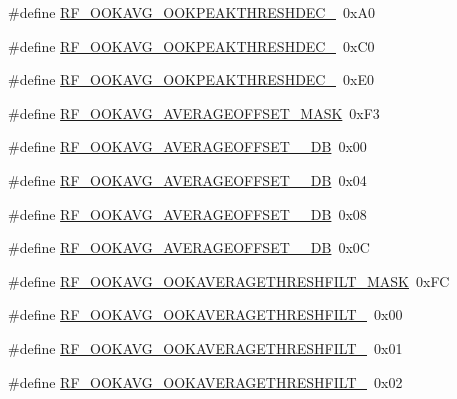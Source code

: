 \begin{DoxyCompactItemize}
\#define \mbox{\hyperlink{sx1276_regs-_fsk_8h_a215d216886d5f06e59bd3c2b877f87c2}{R\+F\+\_\+\+O\+O\+K\+A\+V\+G\+\_\+\+O\+O\+K\+P\+E\+A\+K\+T\+H\+R\+E\+S\+H\+D\+E\+C\+\_}}~0x\+A0
\item 
\#define \mbox{\hyperlink{sx1276_regs-_fsk_8h_a05bf8d929b7d885f20888cc7f3332a8a}{R\+F\+\_\+\+O\+O\+K\+A\+V\+G\+\_\+\+O\+O\+K\+P\+E\+A\+K\+T\+H\+R\+E\+S\+H\+D\+E\+C\+\_}}~0x\+C0
\item 
\#define \mbox{\hyperlink{sx1276_regs-_fsk_8h_a3a072ae3ee56b50bf7de60f4469711df}{R\+F\+\_\+\+O\+O\+K\+A\+V\+G\+\_\+\+O\+O\+K\+P\+E\+A\+K\+T\+H\+R\+E\+S\+H\+D\+E\+C\+\_}}~0x\+E0
\item 
\#define \mbox{\hyperlink{sx1276_regs-_fsk_8h_ae287b34581e54ad15dfa43345e246722}{R\+F\+\_\+\+O\+O\+K\+A\+V\+G\+\_\+\+A\+V\+E\+R\+A\+G\+E\+O\+F\+F\+S\+E\+T\+\_\+\+M\+A\+SK}}~0x\+F3
\item 
\#define \mbox{\hyperlink{sx1276_regs-_fsk_8h_ab6d2934dbc04c61e6c03217796bfbde9}{R\+F\+\_\+\+O\+O\+K\+A\+V\+G\+\_\+\+A\+V\+E\+R\+A\+G\+E\+O\+F\+F\+S\+E\+T\+\_\+\_\+\+DB}}~0x00
\item 
\#define \mbox{\hyperlink{sx1276_regs-_fsk_8h_a1bcf452b92ad86f1bf5d1876bf3764cf}{R\+F\+\_\+\+O\+O\+K\+A\+V\+G\+\_\+\+A\+V\+E\+R\+A\+G\+E\+O\+F\+F\+S\+E\+T\+\_\+\_\+\+DB}}~0x04
\item 
\#define \mbox{\hyperlink{sx1276_regs-_fsk_8h_a0ad417387089ff60df572ff0caea31e3}{R\+F\+\_\+\+O\+O\+K\+A\+V\+G\+\_\+\+A\+V\+E\+R\+A\+G\+E\+O\+F\+F\+S\+E\+T\+\_\+\_\+\+DB}}~0x08
\item 
\#define \mbox{\hyperlink{sx1276_regs-_fsk_8h_a01d49f7bf297e19573e597c1cea201b3}{R\+F\+\_\+\+O\+O\+K\+A\+V\+G\+\_\+\+A\+V\+E\+R\+A\+G\+E\+O\+F\+F\+S\+E\+T\+\_\+\_\+\+DB}}~0x0C
\item 
\#define \mbox{\hyperlink{sx1276_regs-_fsk_8h_a7692c2da6c19d0727a2514eb98b7084d}{R\+F\+\_\+\+O\+O\+K\+A\+V\+G\+\_\+\+O\+O\+K\+A\+V\+E\+R\+A\+G\+E\+T\+H\+R\+E\+S\+H\+F\+I\+L\+T\+\_\+\+M\+A\+SK}}~0x\+FC
\item 
\#define \mbox{\hyperlink{sx1276_regs-_fsk_8h_af32acaba93e5219170d91aa2f860f6f8}{R\+F\+\_\+\+O\+O\+K\+A\+V\+G\+\_\+\+O\+O\+K\+A\+V\+E\+R\+A\+G\+E\+T\+H\+R\+E\+S\+H\+F\+I\+L\+T\+\_}}~0x00
\item 
\#define \mbox{\hyperlink{sx1276_regs-_fsk_8h_af101871f4380dea2544b985a7d162347}{R\+F\+\_\+\+O\+O\+K\+A\+V\+G\+\_\+\+O\+O\+K\+A\+V\+E\+R\+A\+G\+E\+T\+H\+R\+E\+S\+H\+F\+I\+L\+T\+\_}}~0x01
\item 
\#define \mbox{\hyperlink{sx1276_regs-_fsk_8h_a33d6a5bc732f2f47f9f45b93c2d6b4a8}{R\+F\+\_\+\+O\+O\+K\+A\+V\+G\+\_\+\+O\+O\+K\+A\+V\+E\+R\+A\+G\+E\+T\+H\+R\+E\+S\+H\+F\+I\+L\+T\+\_}}~0x02

\end{DoxyCompactItemize}
